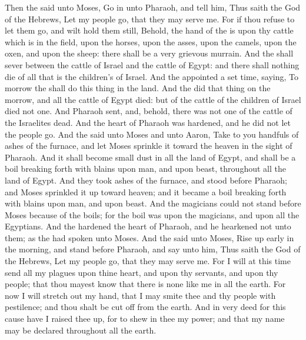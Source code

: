 \begin{biblechapter} %
 Then the \LORD said unto Moses, Go in unto Pharaoh, and tell him, Thus saith the \LORD God of the Hebrews, Let my people go, that they may serve me.
\verse For if thou refuse to let them go, and wilt hold them still,
\verse Behold, the hand of the \LORD is upon thy cattle which is in the field, upon the horses, upon the asses, upon the camels, upon the oxen, and upon the sheep: there shall be a very grievous murrain.
\verse And the \LORD shall sever between the cattle of Israel and the cattle of Egypt: and there shall nothing die of all that is the children's of Israel.
\verse And the \LORD appointed a set time, saying, To morrow the \LORD shall do this thing in the land.
\verse And the \LORD did that thing on the morrow, and all the cattle of Egypt died: but of the cattle of the children of Israel died not one.
\verse And Pharaoh sent, and, behold, there was not one of the cattle of the Israelites dead. And the heart of Pharaoh was hardened, and he did not let the people go.
 And the \LORD said unto Moses and unto Aaron, Take to you handfuls of ashes of the furnace, and let Moses sprinkle it toward the heaven in the sight of Pharaoh.
\verse And it shall become small dust in all the land of Egypt, and shall be a boil breaking forth with blains upon man, and upon beast, throughout all the land of Egypt.
\verse And they took ashes of the furnace, and stood before Pharaoh; and Moses sprinkled it up toward heaven; and it became a boil breaking forth with blains upon man, and upon beast.
\verse And the magicians could not stand before Moses because of the boils; for the boil was upon the magicians, and upon all the Egyptians.
\verse And the \LORD hardened the heart of Pharaoh, and he hearkened not unto them; as the \LORD had spoken unto Moses.
 And the \LORD said unto Moses, Rise up early in the morning, and stand before Pharaoh, and say unto him, Thus saith the \LORD God of the Hebrews, Let my people go, that they may serve me.
\verse For I will at this time send all my plagues upon thine heart, and upon thy servants, and upon thy people; that thou mayest know that there is none like me in all the earth.
\verse For now I will stretch out my hand, that I may smite thee and thy people with pestilence; and thou shalt be cut off from the earth.
\verse And in very deed for this cause have I raised thee up, for to shew in thee my power; and that my name may be declared throughout all the earth.

\end{biblechapter}

